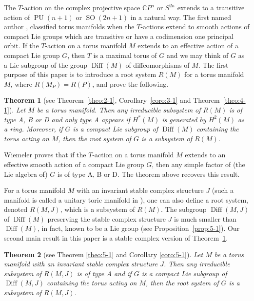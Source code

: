 \documentclass[12pt]{amsart}
\theoremstyle{plain} \numberwithin{equation}{section}
\newtheorem{theo}{Theorem}[section]
\theoremstyle{definition}
\def\C{\mathbb C}
\DeclareMathOperator{\Diff}{Diff}
\DeclareMathOperator{\PU}{PU}
\DeclareMathOperator{\SO}{SO}
\begin{document}
The $T$-action on the complex projective space $\C P^n$ or $S^{2n}$ extends to a transitive action of $\PU(n+1)$ or $\SO(2n+1)$ in a natural way. The first named author \cite{kuro10}, \cite{kuro11} classified torus manifolds when the $T$-actions extend to smooth actions of compact Lie groups which are transitive or have a codimension one principal orbit.  
If the $T$-action on a torus manifold $M$ extends to an effective action of a compact Lie group $G$, then $T$ is a maximal torus of $G$ and we may think of $G$ as a Lie subgroup of the group $\Diff(M)$ of diffeomorphisms of $M$.
The first purpose of this paper is to introduce a root system $R(M)$ for a torus manifold $M$, where $R(M_P)=R(P)$, and prove the following.  

\begin{theo}[see Theorem~\ref{theo:2-1}, Corollary~\ref{coro:3-1} and Theorem~\ref{theo:4-1}] \label{theo:1-1}
Let $M$ be a torus manifold.  Then any irreducible subsystem of $R(M)$ is of type A, B or D and only type A appears if $H^*(M)$ is generated by $H^2(M)$ as a ring. Moreover, if $G$ is a compact Lie subgroup of $\Diff(M)$ containing the torus acting on $M$, then the root system of $G$ is a subsystem of $R(M)$. \end{theo}

Wiemeler \cite{wiem12} proves that if the $T$-action on a torus manifold $M$ extends to an effective smooth action of a compact Lie group $G$, then any simple factor of (the Lie algebra of) $G$ is of type A, B or D.  
The theorem above recovers this result.

For a torus manifold $M$ with an invariant stable complex structure $J$ (such a manifold is called a unitary toric manifold in \cite{masu99}), one can also define a root system, denoted $R(M,J)$, which is a subsystem of $R(M)$.  The subgroup $\Diff(M,J)$ of $\Diff(M)$ preserving the stable complex structure $J$ is much smaller than $\Diff(M)$, in fact, known to be a Lie group (see Proposition~\ref{prop:5-1}). Our second main result in this paper is a stable complex  version of Theorem~\ref{theo:1-1}. 

\begin{theo}[see Theorem \ref{theo:5-1} and Corollary \ref{coro:5-1}] \label{theo:1-2}
Let $M$ be a torus manifold with an invariant stable complex structure $J$. Then any irreducible subsystem of $R(M,J)$ is of type A and if $G$ is a compact Lie subgroup of $\Diff(M,J)$ containing the torus acting on $M$, then the root system of $G$ is a subsystem of $R(M,J)$. 
\end{theo}
\end{document}
